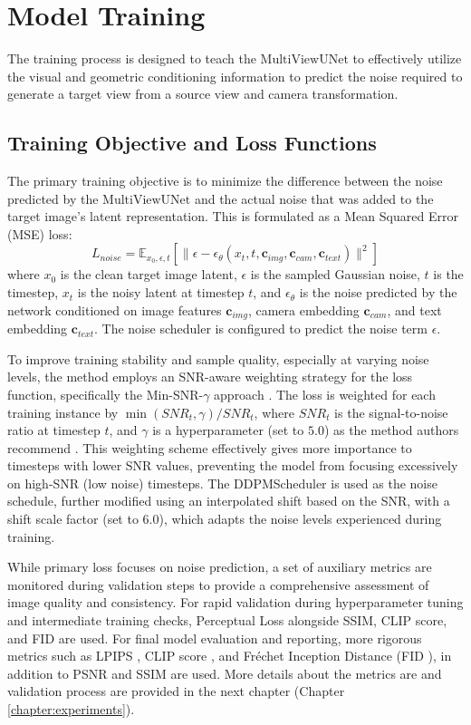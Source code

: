 \section{Model Training}
The training process is designed to teach the $\text{MultiViewUNet}$ to effectively utilize the visual and geometric conditioning information to predict the noise required to generate a target view from a source view and camera transformation.

\subsection{Training Objective and Loss Functions}
The primary training objective is to minimize the difference between the noise predicted by the $\text{MultiViewUNet}$ and the actual noise that was added to the target image's latent representation. This is formulated as a Mean Squared Error (MSE) loss:
\[ L_{noise} = \mathbb{E}_{x_0, \epsilon, t} [\| \epsilon - \epsilon_\theta(x_t, t, \mathbf{c}_{img}, \mathbf{c}_{cam}, \mathbf{c}_{text}) \|^2] \]
where $x_0$ is the clean target image latent, $\epsilon$ is the sampled Gaussian noise, $t$ is the timestep, $x_t$ is the noisy latent at timestep $t$, and $\epsilon_\theta$ is the noise predicted by the network conditioned on image features $\mathbf{c}_{img}$, camera embedding $\mathbf{c}_{cam}$, and text embedding $\mathbf{c}_{text}$. The noise scheduler is configured to predict the noise term $\epsilon$.

To improve training stability and sample quality, especially at varying noise levels, the method employs an SNR-aware weighting strategy for the loss function, specifically the Min-SNR-$\gamma$ approach \cite{minsnr}. The loss is weighted for each training instance by $\min(SNR_t, \gamma) / SNR_t$, where $SNR_t$ is the signal-to-noise ratio at timestep $t$, and $\gamma$ is a hyperparameter (set to $5.0$) as the method authors recommend \cite{minsnr}. This weighting scheme effectively gives more importance to timesteps with lower SNR values, preventing the model from focusing excessively on high-SNR (low noise) timesteps. The DDPMScheduler is used as the noise schedule, further modified using an interpolated shift based on the SNR, with a shift scale factor (set to $6.0$), which adapts the noise levels experienced during training.

While primary loss focuses on noise prediction, a set of auxiliary metrics are monitored during validation steps to provide a comprehensive assessment of image quality and consistency. For rapid validation during hyperparameter tuning and intermediate training checks, Perceptual Loss alongside SSIM, CLIP score, and FID are used. For final model evaluation and reporting, more rigorous metrics such as LPIPS \cite{lpips}, CLIP score \cite{clipscore}, and Fréchet Inception Distance (FID \cite{fid1, fid2}), in addition to PSNR and SSIM are used. More details about the metrics are and validation process are provided in the next chapter (Chapter \ref{chapter:experiments}).

